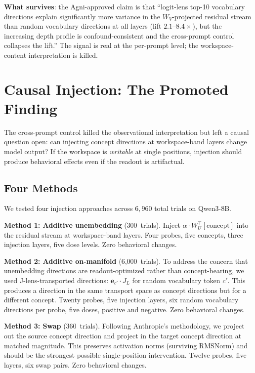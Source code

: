 \documentclass[11pt,a4paper]{article}
\begin{document}
\textbf{What survives}: the Agni-approved claim is that ``logit-lens
top-10 vocabulary directions explain significantly more variance in the
$W_V$-projected residual stream than random vocabulary directions at
all layers (lift $2.1$--$8.4\times$), but the increasing depth profile
is confound-consistent and the cross-prompt control collapses the
lift.'' The signal is real at the per-prompt level; the workspace-content
interpretation is killed.

\section{Causal Injection: The Promoted Finding}
\label{sec:causal}

The cross-prompt control killed the observational interpretation but
left a causal question open: can injecting concept directions at
workspace-band layers change model output? If the workspace is
\emph{writable} at single positions, injection should produce
behavioral effects even if the readout is artifactual.

\subsection{Four Methods}

We tested four injection approaches across $6{,}960$ total trials on
Qwen3-8B.

\textbf{Method 1: Additive unembedding} (300~trials). Inject
$\alpha \cdot W_U^\top[\text{concept}]$ into the residual stream at
workspace-band layers. Four probes, five concepts, three injection
layers, five dose levels. Zero behavioral changes.

\textbf{Method 2: Additive on-manifold} (6{,}000~trials). To address
the concern that unembedding directions are readout-optimized rather
than concept-bearing, we used J-lens-transported directions:
$\mathbf{e}_{c'} \cdot J_L$ for random vocabulary token $c'$. This
produces a direction in the same transport space as concept directions
but for a different concept. Twenty probes, five injection layers,
six random vocabulary directions per probe, five doses, positive and
negative. Zero behavioral changes.

\textbf{Method 3: Swap} (360~trials). Following Anthropic's
methodology, we project out the source concept direction and project in
the target concept direction at matched magnitude. This preserves
activation norms (surviving RMSNorm) and should be the strongest
possible single-position intervention. Twelve probes, five layers, six
swap pairs. Zero behavioral changes.
\end{document}
